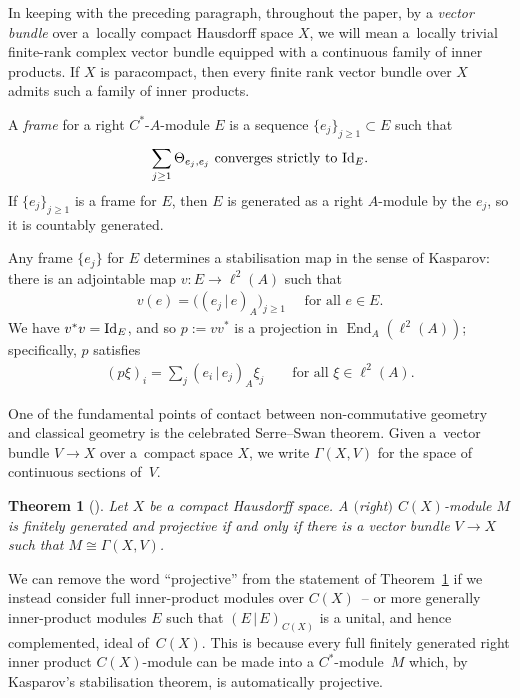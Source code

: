 \documentclass[pdftex]{sigma}
\numberwithin{equation}{section}
\newtheorem{thm}{Theorem}[section]
\DeclareMathOperator{\End}{End} %
\begin{document}
In keeping with the preceding paragraph, throughout the paper, by a \emph{vector bundle} over a~locally compact Hausdorf\/f space $X$, we will mean a~locally trivial f\/inite-rank complex vector bundle equipped with a continuous family of inner products. If $X$ is paracompact, then every f\/inite rank vector bundle over $X$ admits such a family of inner products.

A \emph{frame} for a right $C^*$-$A$-module $E$ is a sequence $\{e_j\}_{j\geq 1}\subset E$ such that
\begin{gather*}
\sum_{j\geq 1}\Theta_{e_j,e_j}\text{ converges strictly to }{\rm Id}_E.%
\end{gather*}
If $\{e_j\}_{j \ge 1}$ is a frame for $E$, then $E$ is generated as a right $A$-module by the $e_j$, so it is countably generated.

Any frame $\{e_j\}$ for $E$ determines a stabilisation map in the sense of Kasparov: there is an adjointable map $v \colon E \to \ell^2(A)$ such that
\begin{gather*}%
v(e) = \big((e_j \,|\, e)_A\big)_{j\geq 1}\quad\text{ for all $e \in E$.}
\end{gather*}
We have $v^*v={\rm Id}_E$, and so $p := vv^*$ is a projection in $\End_A(\ell^2(A))$; specif\/ically, $p$ satisf\/ies
\begin{gather*}
(p \xi)_i = \sum_j (e_i \,|\, e_j)_A \xi_j \qquad\text{for all $\xi \in \ell^2(A)$.}
\end{gather*}

One of the fundamental points of contact between non-commutative geometry and classical geometry is the celebrated Serre--Swan theorem. Given a~vector bundle $V \to X$ over a~compact space $X$, we write $\Gamma(X, V)$ for the space of continuous sections of~$V$.

\begin{thm}[\cite{Swan}]\label{thm:SS} Let $X$ be a compact Hausdorff space. A $($right$)$ $C(X)$-module $M$ is finitely generated and projective if and only if there is a vector bundle $V\to X$ such that $M\cong \Gamma(X,V)$.
\end{thm}

We can remove the word ``projective'' from the statement of Theorem~\ref{thm:SS} if we instead consider full inner-product modules over $C(X)$~-- or more generally inner-product modules $E$ such that $(E \,|\, E)_{C(X)}$ is a unital, and hence complemented, ideal of~$C(X)$. This is because every full f\/initely generated right inner product $C(X)$-module can be made into a $C^*$-module~$M$ which, by Kasparov's stabilisation theorem, is automatically projective.
\end{document}
